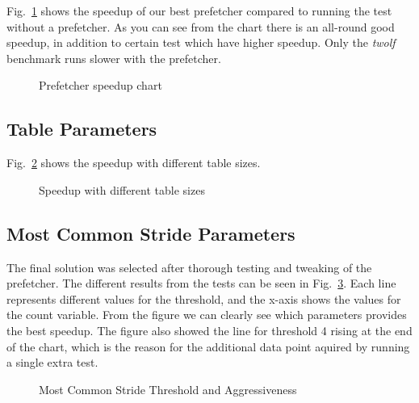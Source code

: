 Fig.~\ref{fig:prefetcher_speedup} shows the speedup of our best prefetcher
compared to running the test without a prefetcher. As you can see from the
chart there is an all-round good speedup, in addition to certain test which
have higher speedup. Only the \emph{twolf} benchmark runs slower with the
prefetcher.

\begin{figure}
	
	\caption{Prefetcher speedup chart}
	\label{fig:prefetcher_speedup}
\end{figure}

\subsection{Table Parameters}
Fig.~\ref{fig:table_size_chart} shows the speedup with different table sizes.

\begin{figure}
	
	\caption{Speedup with different table sizes}
	\label{fig:table_size_chart}
\end{figure}

\subsection{Most Common Stride Parameters}

The final solution was selected after thorough testing and tweaking of the
prefetcher. The different results from the tests can be seen in
Fig.~\ref{fig:prefetcher_tweaks}. Each line represents different values for the
threshold, and the x-axis shows the values for the count variable. From the
figure we can clearly see which parameters provides the best speedup. The
figure also showed the line for threshold 4 rising at the end of the chart,
which is the reason for the additional data point aquired by running a single
extra test.

\begin{figure}
	
	\caption{Most Common Stride Threshold and Aggressiveness}
	\label{fig:prefetcher_tweaks}
\end{figure}
